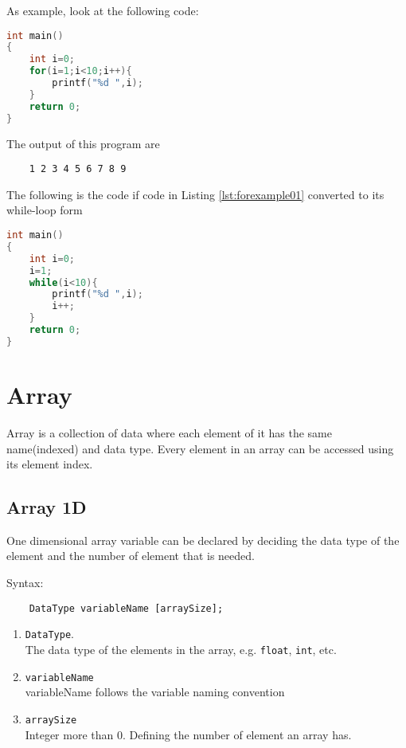 As example, look at the following code:
\begin{lstlisting}[language=c,caption = Contoh Penggunaan for,label=lst:forexample01]
int main()
{
    int i=0;
    for(i=1;i<10;i++){
        printf("%d ",i);
    }
	return 0;
}
\end{lstlisting}
The output of this program are
\begin{verbatim}
    1 2 3 4 5 6 7 8 9 
\end{verbatim}
The following is the code if code in Listing \ref{lst:forexample01} converted to its while-loop form
\begin{lstlisting}[language=c,caption = For dalam bentuk while,label=lst:forwhileform01]
int main()
{
    int i=0;
    i=1;
    while(i<10){
        printf("%d ",i);
        i++;
    }
	return 0;
}
\end{lstlisting}

\section{Array}
Array is a collection of data where each element of it has the same name(indexed) and data type. Every element in an array can be accessed using its element index.
\subsection{Array 1D}
One dimensional array variable can be declared by deciding the data type of the element and the number of element that is needed.

Syntax:
\begin{verbatim}
    DataType variableName [arraySize];
\end{verbatim}
\begin{enumerate}
	\item \verb*|DataType|.\\
    The data type of the elements in the array, e.g. \verb|float|, \verb|int|, etc.
	\item \verb*|variableName|\\
    variableName follows the variable naming convention
	
	\item \verb*|arraySize| \\
    Integer more than 0. Defining the number of element an array has.
\end{enumerate}

